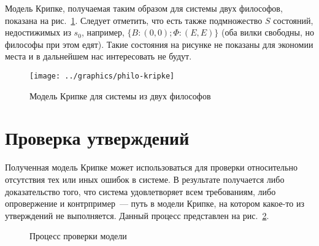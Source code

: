 Модель Крипке, получаемая таким образом для системы двух философов, показана на
рис.~\ref{fig:philo2-kripke}. Следует отметить, что есть также подмножество $S$ состояний,
недостижимых из $s_0$, например, $\{B: (0, 0); \Phi: (E, E)\}$ (оба вилки свободны, но
философы при этом едят). Такие состояния на рисунке не показаны для экономии места и в
дальнейшем нас интересовать не будут.

\begin{figure}[ht]
  \centering
  \texttt{[image: ../graphics/philo-kripke]}
  \caption{Модель Крипке для системы из двух философов}
  \label{fig:philo2-kripke}
\end{figure}

\section{Проверка утверждений}
\label{sec:kripke-verification}

Полученная модель Крипке может использоваться для проверки относительно отсутствия тех или
иных ошибок в системе. В результате получается либо доказательство того, что система
удовлетворяет всем требованиям, либо опровержение и контрпример~--- путь в модели Крипке,
на котором какое-то из утверждений не выполняется. Данный процесс представлен на
рис.~\ref{fig:idef0-verification}.

\begin{figure}[htb]
  \centering
  \caption{Процесс проверки модели}
  \label{fig:idef0-verification}
\end{figure}

